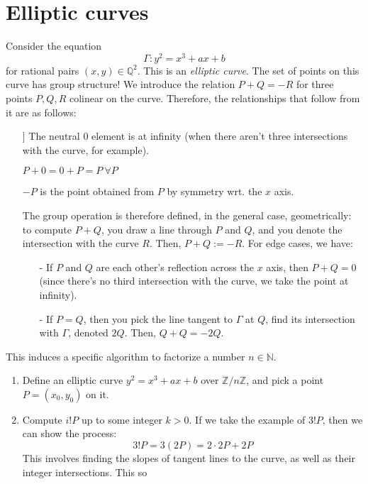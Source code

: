 \chapter{Elliptic curves}


Consider the equation
\[
  \Gamma: y^2 = x^3 + ax + b 
\]
for rational pairs $(x, y) \in \mathbb{Q}^2$. This is an \emph{elliptic curve}. The set of points on this curve has group structure! We introduce the relation $P + Q = -R$ for three points $P, Q, R$ colinear on the curve. Therefore, the relationships that follow from it are as follows: 
\begin{enumerate}
  \item[]] The neutral 0 element is at infinity (when there aren't three intersections with the curve, for example).
  \item[] $P + 0 = 0 + P = P {\ \forall} P$
  \item[] $-P$ is the point obtained from $P$ by symmetry wrt. the $x$ axis.
  \item[] The group operation is therefore defined, in the general case, geometrically: to compute $P + Q$, you draw a line through $P$ and $Q$, and you denote the intersection with the curve $R$. Then, $P + Q := -R$. For edge cases, we have: 
  \begin{itemize}
    \item[-] If $P$ and $Q$ are each other's reflection across the $x$ axis, then $P + Q = 0$ (since there's no third intersection with the curve, we take the point at infinity).
    \item[-] If $P = Q$, then you pick the line tangent to $\Gamma$ at $Q$, find its intersection with $\Gamma$, denoted $2Q$. Then, $Q + Q = -2Q$.
  \end{itemize}
\end{enumerate}
This induces a specific algorithm to factorize a number $n \in \mathbb{N}$. 
\begin{enumerate}
  \item Define an elliptic curve $y^2 = x^3 + ax + b$ over $\mathbb{Z}/n\mathbb{Z}$, and pick a point $P = (x_0, y_0)$ on it. 
  \item Compute $i!P$ up to some integer $k>0$. If we take the example of $3!P$, then we can show the process:
  \[
    3!P = 3(2P) = 2 \cdot 2P + 2P
  \]
  This involves finding the slopes of tangent lines to the curve, as well as their integer intersections. This so

\end{enumerate}